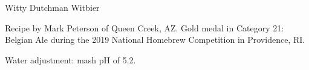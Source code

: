 \begin{recipe}{Witty Dutchman Witbier} %

\begin{aboutblock}
Recipe by Mark Peterson of Queen Creek, AZ. Gold medal in Category 21: Belgian
Ale during the 2019 National Homebrew Competition in Providence, RI. \sourceaha
\end{aboutblock}


\begin{methodandtiming}
 
\begin{mashsteps}
\end{mashsteps}

\begin{fermentationsteps}
\end{fermentationsteps}

\begin{directions}
Water adjustment: mash pH of 5.2.
\end{directions}

\end{methodandtiming}

\recipebreak

\begin{ingredientsblock}

\begin{malts}
\end{malts}

\begin{hops}
\end{hops}


\end{ingredientsblock}

\end{recipe}

